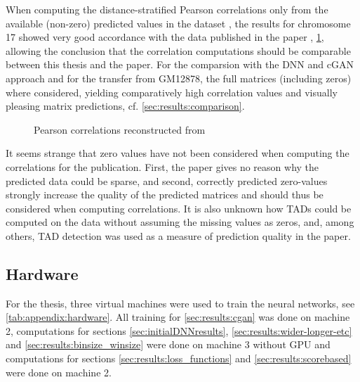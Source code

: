 When computing the distance-stratified Pearson correlations only from the available (non-zero) predicted values in the dataset \xxx,
the results for chromosome 17 showed very good accordance with the data published in the paper \cite[fig.\,10]{Zhang2019}, \cref{fig:methods:zhang_correlations_reconstructed},
allowing the conclusion that the correlation computations should be comparable between this thesis and the paper.
For the comparsion with the DNN and cGAN approach and for the transfer from GM12878, the full matrices (including zeros) where considered,
yielding comparatively high correlation values and visually pleasing matrix predictions, cf. \ref{sec:results:comparison}.
\begin{figure}[htbp]
 \begin{subfigure}{0.45\textwidth}
 \end{subfigure}\hfill
 \begin{subfigure}{0.45\textwidth}
 \end{subfigure}
\caption{Pearson correlations reconstructed from \cite{Zhang2019}} \label{fig:methods:zhang_correlations_reconstructed}
\end{figure}


It seems strange that zero values have not been considered when computing the correlations for the publication.
First, the paper gives no reason why the predicted data could be sparse, and second, 
correctly predicted zero-values strongly increase the quality of the predicted matrices and should thus be considered when computing correlations.
It is also unknown how TADs could be computed on the data without assuming the missing values as zeros,
and, among others, TAD detection was used as a measure of prediction quality in the paper.


\subsection{Hardware} \label{sec:methods:hardware}
For the thesis, three virtual machines were used to train the neural networks, see \cref{tab:appendix:hardware}.
All training for \cref{sec:results:cgan} was done on machine 2, 
computations for sections \ref{sec:initialDNNresults}, \ref{sec:results:wider-longer-etc} and \ref{sec:results:binsize_winsize}
were done on machine 3 without GPU and computations for sections \ref{sec:results:loss_functions} and \ref{sec:results:scorebased} were done on machine 2.

